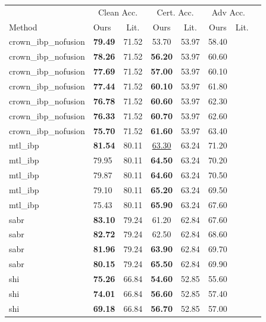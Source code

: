 \begin{tabular}{llcccccc}
\toprule
 & \multicolumn{2}{c}{Clean Acc.} & \multicolumn{2}{c}{Cert. Acc.} & \multicolumn{2}{c}{Adv Acc.} \\
Method & Ours & Lit. & Ours & Lit. & Ours & Lit. \\
\midrule
crown\_ibp\_nofusion & \textbf{79.49} & 71.52 & 53.70 & 53.97 & 58.40 & \\
crown\_ibp\_nofusion & \textbf{78.26} & 71.52 & \textbf{56.20} & 53.97 & 60.60 & \\
crown\_ibp\_nofusion & \textbf{77.69} & 71.52 & \textbf{57.00} & 53.97 & 60.10 & \\
crown\_ibp\_nofusion & \textbf{77.44} & 71.52 & \textbf{60.10} & 53.97 & 61.80 & \\
crown\_ibp\_nofusion & \textbf{76.78} & 71.52 & \textbf{60.60} & 53.97 & 62.30 & \\
crown\_ibp\_nofusion & \textbf{76.33} & 71.52 & \textbf{60.70} & 53.97 & 62.60 & \\
crown\_ibp\_nofusion & \textbf{75.70} & 71.52 & \textbf{61.60} & 53.97 & 63.40 & \\
mtl\_ibp & \textbf{81.54} & 80.11 & \underline{63.30} & 63.24 & 71.20 & \\
mtl\_ibp & 79.95 & 80.11 & \textbf{64.50} & 63.24 & 70.20 & \\
mtl\_ibp & 79.87 & 80.11 & \textbf{64.60} & 63.24 & 70.50 & \\
mtl\_ibp & 79.10 & 80.11 & \textbf{65.20} & 63.24 & 69.50 & \\
mtl\_ibp & 75.43 & 80.11 & \textbf{65.90} & 63.24 & 67.60 & \\
sabr & \textbf{83.10} & 79.24 & 61.20 & 62.84 & 67.60 & \\
sabr & \textbf{82.72} & 79.24 & 62.50 & 62.84 & 68.60 & \\
sabr & \textbf{81.96} & 79.24 & \textbf{63.90} & 62.84 & 69.70 & \\
sabr & \textbf{80.15} & 79.24 & \textbf{65.50} & 62.84 & 69.90 & \\
shi & \textbf{75.26} & 66.84 & \textbf{54.60} & 52.85 & 55.60 & \\
shi & \textbf{74.01} & 66.84 & \textbf{56.60} & 52.85 & 57.40 & \\
shi & \textbf{69.18} & 66.84 & \textbf{56.70} & 52.85 & 57.00 & \\
\bottomrule
\end{tabular}